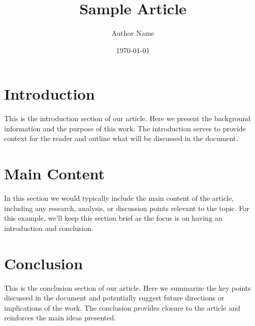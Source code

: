 \documentclass{article}
\title{Sample Article}
\author{Author Name}
\date{\today}
\begin{document}
\maketitle

\section{Introduction}
This is the introduction section of our article. Here we present the background information and the purpose of this work. The introduction serves to provide context for the reader and outline what will be discussed in the document.

\section{Main Content}
In this section we would typically include the main content of the article, including any research, analysis, or discussion points relevant to the topic. For this example, we'll keep this section brief as the focus is on having an introduction and conclusion.

\section{Conclusion}
This is the conclusion section of our article. Here we summarize the key points discussed in the document and potentially suggest future directions or implications of the work. The conclusion provides closure to the article and reinforces the main ideas presented.
\end{document}
